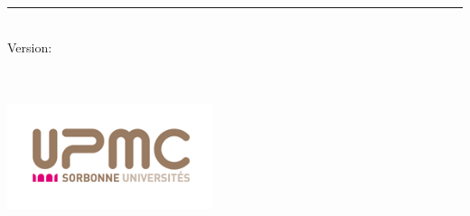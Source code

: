 %
\begin{titlepage}
	\flushright
	\hfill
	\vfill
	{\LARGE\thesisTitle \par}
	\rule[5pt]{\textwidth}{.4pt} \par
	{\Large\thesisName}
	\vfill
	\textit{\large\thesisDate} \\
	Version: \thesisVersion
\end{titlepage}


\begin{titlepage}
	\tgherosfont
	\centering

	{\Huge \thesisUniversity} \\[2mm]
    {\Large \thesisUniversityDepartment} \\[4mm]
	\includegraphics[width=6cm]{gfx/upmc_logo.png} \\[2mm]
	
	\textsf{\large \thesisUniversityGroup} \\
    \textsf{\large \thesisUniversityInstitute} \\

	\vfill
	{\Large \thesisSubject} \\[5mm]
	{\LARGE \color{ctcolortitle}\textbf{\thesisTitle} \\[10mm]}
	{\Large \thesisName} \\


\end{titlepage}
